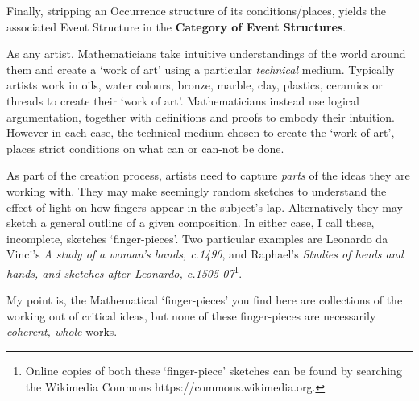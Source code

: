 Finally, stripping an Occurrence structure of its conditions/places, yields the
associated Event Structure in the \textbf{Category of Event Structures}.


As any artist, Mathematicians take intuitive understandings of the world around
them and create a `work of art' using a particular \emph{technical} medium.
Typically artists work in oils, water colours, bronze, marble, clay, plastics,
ceramics or threads to create their `work of art'. Mathematicians instead use
logical argumentation, together with definitions and proofs to embody their
intuition. However in each case, the technical medium chosen to create the `work
of art', places strict conditions on what can or can-not be done.

As part of the creation process, artists need to capture \emph{parts} of the
ideas they are working with. They may make seemingly random sketches to
understand the effect of light on how fingers appear in the subject's lap.
Alternatively they may sketch a general outline of a given composition. In
either case, I call these, incomplete, sketches `finger-pieces'. Two particular
examples are Leonardo da Vinci's \emph{A study of a woman's hands, c.1490}, and
Raphael's \emph{Studies of heads and hands, and sketches after Leonardo,
c.1505-07}\footnote{Online copies of both these `finger-piece' sketches can be
found by searching the Wikimedia Commons https://commons.wikimedia.org.}.

My point is, the Mathematical `finger-pieces' you find here are collections of
the working out of critical ideas, but none of these finger-pieces are
necessarily \emph{coherent, whole} works. 

